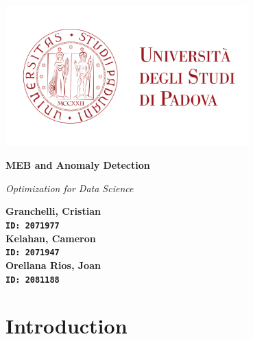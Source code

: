 \documentclass[12pt,a4paper]{article}
\newcommand{\titlestr}{MEB and Anomaly Detection}
\begin{document}
\begin{titlepage}
   \centering
   \includegraphics[width=0.7\textwidth]{unipd_logo.png}

   \vspace{1cm}
   {\LARGE \bf{\titlestr} \par}

   \vspace{.5cm}

   {\LARGE {\it{Optimization for Data Science}} \par}

   \vspace{2cm}

   \bf{
      Granchelli, Cristian\\
    \texttt{ID: 2071977}\\
    \vspace{1cm}
    Kelahan, Cameron\\
    \texttt{ID: 2071947}\\
    \vspace{1cm}
    Orellana Rios, Joan\\
    \texttt{ID: 2081188}
   }\\


\end{titlepage}


\begin{abstract}
   The ABSTRACT is to be in fully-justified italicized text, at the top
   of the left-hand column, below the author and affiliation
   information. Use the word ``Abstract'' as the title, in 12-point
   Times, boldface type, centered relative to the column, initially
   capitalized. The abstract is to be in 10-point, single-spaced type.
   Leave two blank lines after the Abstract, then begin the main text.
   Abstract should be no longer than 300 words.
\end{abstract}

\section{Introduction}
\end{document}
